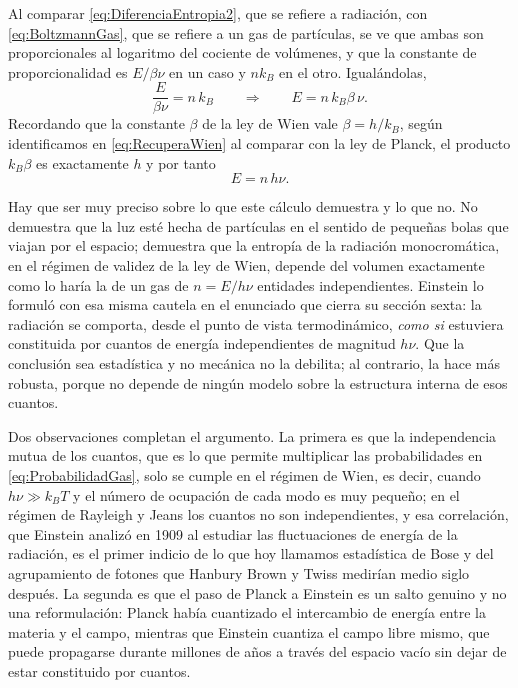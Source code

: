             Al comparar \eqref{eq:DiferenciaEntropia2}, que se refiere a radiación, con \eqref{eq:BoltzmannGas}, que se refiere a un gas de partículas, se ve que ambas son proporcionales al logaritmo del cociente de volúmenes, y que la constante de proporcionalidad es $E/\beta\nu$ en un caso y $nk_{B}$ en el otro. Igualándolas,
            \begin{equation}\label{eq:IgualacionEinstein}
                \frac{E}{\beta\nu} = n\,k_{B}
                \qquad\Longrightarrow\qquad
                E = n\,k_{B}\beta\,\nu .
            \end{equation}
            Recordando que la constante $\beta$ de la ley de Wien vale $\beta = h/k_{B}$, según identificamos en \eqref{eq:RecuperaWien} al comparar con la ley de Planck, el producto $k_{B}\beta$ es exactamente $h$ y por tanto
            \begin{equation}\label{eq:ResultadoEinstein}
                \boxed{\;E = n\,h\nu .\;}
            \end{equation}

            Hay que ser muy preciso sobre lo que este cálculo demuestra y lo que no. No demuestra que la luz esté hecha de partículas en el sentido de pequeñas bolas que viajan por el espacio; demuestra que la entropía de la radiación monocromática, en el régimen de validez de la ley de Wien, depende del volumen exactamente como lo haría la de un gas de $n = E/h\nu$ entidades independientes. Einstein lo formuló con esa misma cautela en el enunciado que cierra su sección sexta: la radiación se comporta, desde el punto de vista termodinámico, \textit{como si} estuviera constituida por cuantos de energía independientes de magnitud $h\nu$. Que la conclusión sea estadística y no mecánica no la debilita; al contrario, la hace más robusta, porque no depende de ningún modelo sobre la estructura interna de esos cuantos.

            Dos observaciones completan el argumento. La primera es que la independencia mutua de los cuantos, que es lo que permite multiplicar las probabilidades en \eqref{eq:ProbabilidadGas}, solo se cumple en el régimen de Wien, es decir, cuando $h\nu\gg k_{B}T$ y el número de ocupación de cada modo es muy pequeño; en el régimen de Rayleigh y Jeans los cuantos no son independientes, y esa correlación, que Einstein analizó en 1909 al estudiar las fluctuaciones de energía de la radiación, es el primer indicio de lo que hoy llamamos estadística de Bose y del agrupamiento de fotones que Hanbury Brown y Twiss medirían medio siglo después. La segunda es que el paso de Planck a Einstein es un salto genuino y no una reformulación: Planck había cuantizado el intercambio de energía entre la materia y el campo, mientras que Einstein cuantiza el campo libre mismo, que puede propagarse durante millones de años a través del espacio vacío sin dejar de estar constituido por cuantos.

